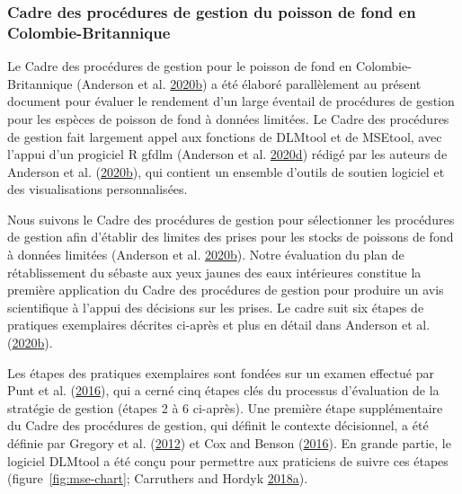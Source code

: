 \documentclass[11pt]{book}
\begin{document}
\hypertarget{sec:introduction-mp-framework}{%
\subsubsection{Cadre des procédures de gestion du poisson de fond en Colombie-Britannique}\label{sec:introduction-mp-framework}}

Le Cadre des procédures de gestion pour le poisson de fond en Colombie-Britannique (Anderson et al. \protect\hyperlink{ref-anderson2020gfmp}{2020}\protect\hyperlink{ref-anderson2020gfmp}{b}) a été élaboré parallèlement au présent document pour évaluer le rendement d'un large éventail de procédures de gestion pour les espèces de poisson de fond à données limitées. Le Cadre des procédures de gestion fait largement appel aux fonctions de DLMtool et de MSEtool, avec l'appui d'un progiciel R gfdlm (Anderson et al. \protect\hyperlink{ref-gfdlm}{2020}\protect\hyperlink{ref-gfdlm}{d}) rédigé par les auteurs de Anderson et al. (\protect\hyperlink{ref-anderson2020gfmp}{2020}\protect\hyperlink{ref-anderson2020gfmp}{b}), qui contient un ensemble d'outils de soutien logiciel et des visualisations personnalisées.

Nous suivons le Cadre des procédures de gestion pour sélectionner les procédures de gestion afin d'établir des limites des prises pour les stocks de poissons de fond à données limitées (Anderson et al. \protect\hyperlink{ref-anderson2020gfmp}{2020}\protect\hyperlink{ref-anderson2020gfmp}{b}). Notre évaluation du plan de rétablissement du sébaste aux yeux jaunes des eaux intérieures constitue la première application du Cadre des procédures de gestion pour produire un avis scientifique à l'appui des décisions sur les prises. Le cadre suit six étapes de pratiques exemplaires décrites ci-après et plus en détail dans Anderson et al. (\protect\hyperlink{ref-anderson2020gfmp}{2020}\protect\hyperlink{ref-anderson2020gfmp}{b}).

Les étapes des pratiques exemplaires sont fondées sur un examen effectué par Punt et al. (\protect\hyperlink{ref-punt2016}{2016}), qui a cerné cinq étapes clés du processus d'évaluation de la stratégie de gestion (étapes 2 à 6 ci-après). Une première étape supplémentaire du Cadre des procédures de gestion, qui définit le contexte décisionnel, a été définie par Gregory et al. (\protect\hyperlink{ref-gregory2012}{2012}) et Cox and Benson (\protect\hyperlink{ref-cox2016}{2016}). En grande partie, le logiciel DLMtool a été conçu pour permettre aux praticiens de suivre ces étapes (figure~\ref{fig:mse-chart}; Carruthers and Hordyk \protect\hyperlink{ref-carruthers2018}{2018}\protect\hyperlink{ref-carruthers2018}{a}).
\end{document}
